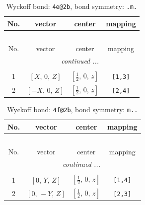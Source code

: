 \documentclass[fleqn,8pt]{jsarticle}
\begin{document}
\renewcommand{\arraystretch}{1.2}
\begin{longtable}{cccc}
\caption{Wyckoff bond: {\tt 4e@2b}, bond symmetry: {\tt .m.}}
 \\
 \hline \hline
No. & vector & center & mapping \\ \hline \endfirsthead

\multicolumn{3}{l}{\tablename\ \thetable{}} \\
 \hline \hline
No. & vector & center & mapping \\ \hline \endhead

 \hline \hline
\multicolumn{3}{r}{\footnotesize\it continued ...} \\ \endfoot

 \hline \hline
\multicolumn{3}{r}{} \\ \endlastfoot

1 & $\left[ X,\, 0,\, Z \right]$ & $\left[ \frac{1}{2},\, 0,\, z \right]$ & {\tt [1,3]} \\ \hline
2 & $\left[ - X,\, 0,\, Z \right]$ & $\left[ \frac{1}{2},\, 0,\, z \right]$ & {\tt [2,4]} \\
\end{longtable}
\renewcommand{\arraystretch}{1.2}
\begin{longtable}{cccc}
\caption{Wyckoff bond: {\tt 4f@2b}, bond symmetry: {\tt m..}}
 \\
 \hline \hline
No. & vector & center & mapping \\ \hline \endfirsthead

\multicolumn{3}{l}{\tablename\ \thetable{}} \\
 \hline \hline
No. & vector & center & mapping \\ \hline \endhead

 \hline \hline
\multicolumn{3}{r}{\footnotesize\it continued ...} \\ \endfoot

 \hline \hline
\multicolumn{3}{r}{} \\ \endlastfoot

1 & $\left[ 0,\, Y,\, Z \right]$ & $\left[ \frac{1}{2},\, 0,\, z \right]$ & {\tt [1,4]} \\ \hline
2 & $\left[ 0,\, - Y,\, Z \right]$ & $\left[ \frac{1}{2},\, 0,\, z \right]$ & {\tt [2,3]} \\
\end{longtable}
\renewcommand{\arraystretch}{1.2}
\end{document}
